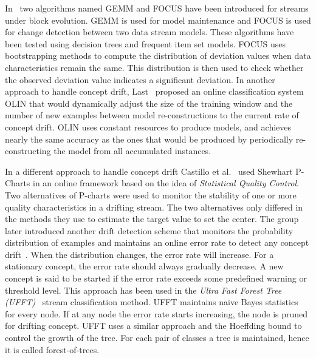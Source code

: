 In~\cite{ganti02:gemm:focus} two algorithms named GEMM and FOCUS have been introduced for streams under block evolution. GEMM is used for model maintenance and FOCUS is used for change detection between two data stream models. These algorithms have been tested using decision trees and frequent item set models. FOCUS uses bootstrapping methods to compute the distribution of deviation values when data characteristics remain the same. This distribution is then used to check whether the observed deviation value indicates a significant deviation. In another approach to handle concept drift, Last~\cite{last02:olin} proposed an online classification system OLIN that would dynamically adjust the size of the training window and the number of new examples between model re-constructions to the current rate of concept drift. OLIN uses constant resources to produce models, and achieves nearly the same accuracy as the ones that would be produced by periodically re-constructing the model from all accumulated instances.


In a different approach to handle concept drift Castillo et al.~\cite{gama03:drift} used Shewhart P-Charts in an online framework based on the idea of \textit{Statistical Quality Control}. Two alternatives of P-charts were used to monitor the stability of one or more quality characteristics in a drifting stream. The two alternatives only differed in the methods they use to estimate the target value to set the center. The group later introduced another drift detection scheme that monitors the probability distribution of examples and maintains an online error rate to detect any concept drift~\cite{gama04:drift}. When the distribution changes, the error rate will increase. For a stationary concept, the error rate should always gradually decrease. A new concept is said to be started if the error rate exceeds some predefined warning or threshold level. This approach has been used in the \textit{Ultra Fast Forest Tree (UFFT)}~\cite{gama04:ft, gama05:ft} stream classification method. UFFT maintains naive Bayes statistics for every node. If at any node the error rate starts increasing, the node is pruned for drifting concept. UFFT uses a similar approach and the Hoeffding bound to control the growth of the tree. For each pair of classes a tree is maintained, hence it is called forest-of-trees.

